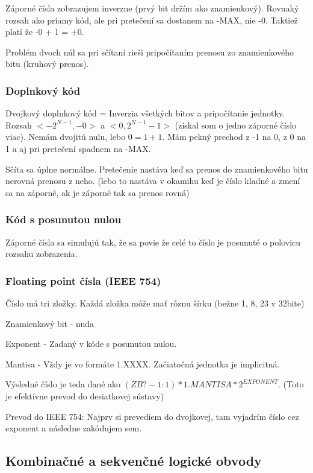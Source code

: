\documentclass[a4paper,10pt]{article}
\begin{document}
\begin{multicols}{2}
			Záporné čísla zobrazujem inverzne (prvý bit držím ako znamienkový). Rovnaký rozsah ako priamy kód, ale pri pretečení sa dostanem na -MAX, nie -0. Taktiež platí že -0 + 1 = +0.
			
			Problém dvoch núl sa pri sčítaní rieši pripočítaním prenosu zo znamienkového bitu (kruhový prenos).
			
		\subsubsection{Doplnkový kód}
		
			Dvojkový doplnkový kód = Inverzia všetkých bitov a pripočítanie jednotky. Rozsah $<-2^{N-1}, -0>$ a $<0, 2^{N-1} - 1>$ (získal som o jedno záporné číslo viac). Nemám dvojitú nulu, lebo $ 0 = 1 + 1 $. Mám pekný prechod z -1 na 0, z 0 na 1 a aj pri pretečení spadnem na -MAX.
			
			Sčíta sa úplne normálne. Pretečenie nastáva keď sa prenos do znamienkového bitu nerovná prenosu z neho. (lebo to nastáva v okamihu keď je číslo kladné a zmení sa na záporné, ak je záporné tak sa prenos rovná)
			
		\subsubsection{Kód s posunutou nulou}
		
			Záporné čísla sa simulujú tak, že sa povie že celé to číslo je posunuté o polovicu rozsahu zobrazenia.
		
		\subsubsection{Floating point čísla (IEEE 754)}
		
			Číslo má tri zložky. Každá zložka môže mať rôznu šírku (bežne 1, 8, 23 v 32bite)
			
			Znamienkový bit - nuda
			
			Exponent - Zadaný v kóde s posunutou nulou.
			
			Mantisa - Vždy je vo formáte 1.XXXX. Začiatočná jednotka je implicitná. 
			
			Výsledné číslo je teda dané ako $(ZB ? -1 : 1) * 1.MANTISA * 2^{EXPONENT}$. (Toto je efektívne prevod do desiatkovej sústavy)
			
			Prevod do IEEE 754: Najprv si prevediem do dvojkovej, tam vyjadrím číslo cez exponent a následne zakódujem sem.
						
	\subsection{Kombinačné a sekvenčné logické obvody}
	

\end{multicols}
\end{document}
